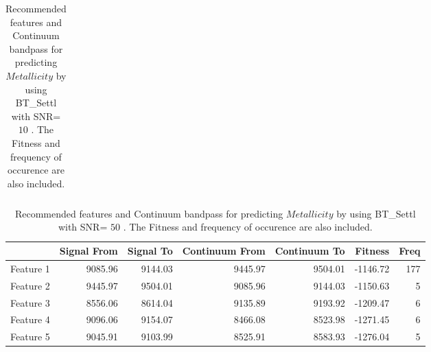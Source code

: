 \begin{table}
\begin{center}
\begin{tabular}{rrrrrrr}
   \hline
\end{tabular}
\caption {Recommended features and Continuum bandpass for predicting $Metallicity$ 
     by using BT\_Settl with SNR= $ 10 $ . 
      The Fitness and frequency of occurence are also included.} \label{tab:tab_SNR10_M} 
\end{center}
\end{table}

\begin{table}
\begin{center}
\begin{tabular}{rrrrrrr}
  \hline
 & Signal From & Signal To & Continuum From & Continuum To & Fitness & Freq \\ 
  \hline
Feature 1 & 9085.96 & 9144.03 & 9445.97 & 9504.01  & -1146.72 & 177 \\ 
  Feature 2 & 9445.97 & 9504.01 & 9085.96 & 9144.03 & -1150.63 &  5 \\ 
  Feature 3 & 8556.06 & 8614.04 & 9135.89 & 9193.92 & -1209.47 &  6 \\ 
  Feature 4 & 9096.06 & 9154.07 & 8466.08 & 8523.98 & -1271.45 &   6 \\ 
  Feature 5 & 9045.91 & 9103.99 & 8525.91 & 8583.93 & -1276.04 &   5 \\  
   \hline
\end{tabular}
\caption {Recommended features and Continuum bandpass for predicting $Metallicity$ 
     by using BT\_Settl with SNR= $ 50 $ . 
      The Fitness and frequency of occurence are also included.} \label{tab:tab_SNR50_M} 
\end{center}
\end{table}
  
